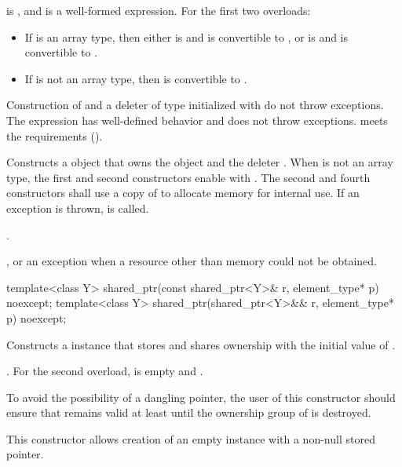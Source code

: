 \begin{itemdescr}
\pnum
\constraints
{} is , and
 is a well-formed expression.
For the first two overloads:

\begin{itemize}
\item
If  is an array type, then either
 is  and  is convertible to , or
 is  and  is convertible to .

\item
If  is not an array type, then  is convertible to .
\end{itemize}

\pnum
\expects
Construction of  and a deleter of type 
initialized with  do not throw exceptions.
The expression 
has well-defined behavior and does not throw exceptions.
 meets the  requirements ().

\pnum
\effects
Constructs a  object that owns the
object  and the deleter .
When  is not an array type,
the first and second constructors enable  with .
The second and fourth constructors shall use a copy of  to
allocate memory for internal use.
If an exception is thrown,  is called.

\pnum
\ensures
{}.

\pnum
\throws
{}, or an  exception
when a resource other than memory could not be obtained.
\end{itemdescr}

%
\begin{itemdecl}
template<class Y> shared_ptr(const shared_ptr<Y>& r, element_type* p) noexcept;
template<class Y> shared_ptr(shared_ptr<Y>&& r, element_type* p) noexcept;
\end{itemdecl}

\begin{itemdescr}
\pnum
\effects
Constructs a  instance that
stores  and shares ownership with
the initial value of .

\pnum
\ensures
{}.
For the second overload,
 is empty and .

\pnum
\begin{note}
To avoid the possibility of a dangling pointer, the
user of this constructor should ensure that  remains valid at
least until the ownership group of  is destroyed.
\end{note}

\pnum
\begin{note}
This constructor allows creation of an empty
 instance with a non-null stored pointer.
\end{note}
\end{itemdescr}

